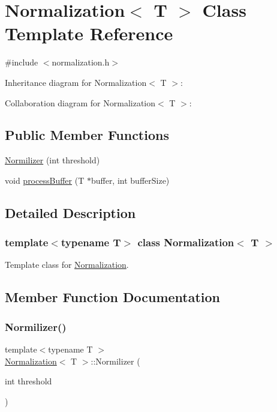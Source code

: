 \hypertarget{classNormalization}{}\section{Normalization$<$ T $>$ Class Template Reference}
\label{classNormalization}


{\ttfamily \#include $<$normalization.\+h$>$}



Inheritance diagram for Normalization$<$ T $>$\+:


Collaboration diagram for Normalization$<$ T $>$\+:
\subsection*{Public Member Functions}
\begin{DoxyCompactItemize}
\item 
\hyperlink{classNormalization_ad059c4c8fb02062ae744443507398e37}{Normilizer} (int threshold)
\item 
void \hyperlink{classNormalization_a8cdf89da77b8b7785f0065df8e1d9da2}{process\+Buffer} (T $\ast$buffer, int buffer\+Size)
\end{DoxyCompactItemize}


\subsection{Detailed Description}
\subsubsection*{template$<$typename T$>$\newline
class Normalization$<$ T $>$}

Template class for \hyperlink{classNormalization}{Normalization}. 

\subsection{Member Function Documentation}
\mbox{\label{classNormalization_ad059c4c8fb02062ae744443507398e37}} 
\subsubsection{\texorpdfstring{Normilizer()}{Normilizer()}}
{\footnotesize\ttfamily template$<$typename T $>$ \\
\hyperlink{classNormalization}{Normalization}$<$ T $>$\+::Normilizer (\begin{DoxyParamCaption}\item[{int}]{threshold }\end{DoxyParamCaption})}

